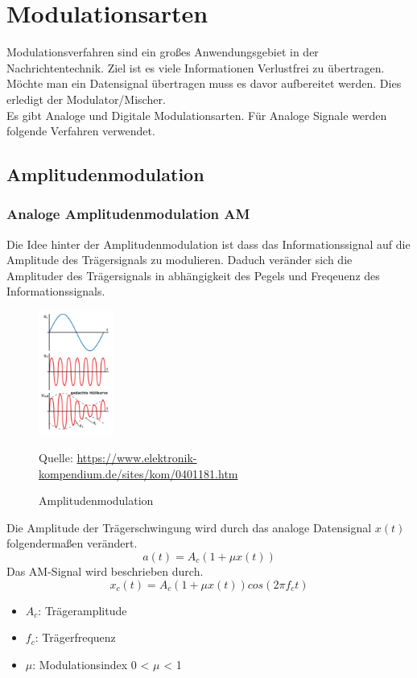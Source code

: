 \section{Modulationsarten}
Modulationsverfahren sind ein großes Anwendungsgebiet in der Nachrichtentechnik.
Ziel ist es viele Informationen Verlustfrei zu übertragen.
Möchte man ein Datensignal übertragen muss es davor
aufbereitet werden. Dies erledigt der Modulator/Mischer.
\\
Es gibt Analoge und Digitale Modulationsarten.
Für Analoge Signale werden folgende Verfahren verwendet.


\subsection{Amplitudenmodulation}
\subsubsection{Analoge Amplitudenmodulation AM}
Die Idee hinter der Amplitudenmodulation ist dass das Informationssignal
auf die Amplitude des Trägersignals zu modulieren.
Daduch veränder sich die Amplituder des Trägersignals in abhängigkeit des Pegels und 
Freqeuenz des Informationssignals.
\\
\begin{figure}[H]
    \centering
    \includegraphics[width=0.22\textwidth]{Pictures/Screenshot 2025-06-19 125508.png}
    \caption{Amplitudenmodulation}
    \footnotesize{Quelle: \url{https://www.elektronik-kompendium.de/sites/kom/0401181.htm}}
    \label{fig:link_budget}
\end{figure}
\clearpage
Die Amplitude der Trägerschwingung wird durch das analoge Datensignal
$x(t)$ folgendermaßen verändert.
\begin{equation}
    a(t)=A_c(1+\mu x(t))
\end{equation}
Das AM-Signal wird beschrieben durch.
\begin{equation}
    x_c(t)=A_c(1+\mu x(t))cos(2\pi f_c t)
\end{equation}
\begin{itemize}
    \item $A_c$: Trägeramplitude
    \item $f_c$: Trägerfrequenz
    \item $\mu$: Modulationsindex 0 < $\mu$ < 1
\end{itemize}

